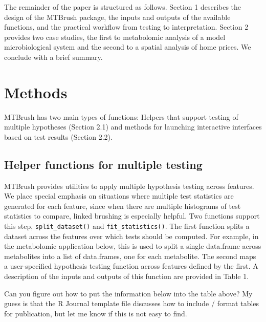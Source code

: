 The remainder of the paper is structured as follows. Section 1 describes
the design of the MTBrush package, the inputs and outputs of the
available functions, and the practical workflow from testing to
interpretation. Section 2 provides two case studies, the first to
metabolomic analysis of a model microbiological system and the second to
a spatial analysis of home prices. We conclude with a brief summary.

\hypertarget{methods}{%
\section{Methods}\label{methods}}

MTBrush has two main types of functions: Helpers that support testing of
multiple hypotheses (Section 2.1) and methods for launching interactive
interfaces based on test results (Section 2.2).

\hypertarget{helper-functions-for-multiple-testing}{%
\subsection{Helper functions for multiple
testing}\label{helper-functions-for-multiple-testing}}

MTBrush provides utilities to apply multiple hypothesis testing across
features. We place special emphasis on situations where multiple test
statistics are generated for each feature, since when there are multiple
histograms of test statistics to compare, linked brushing is especially
helpful. Two functions support this step, \texttt{split\_dataset()} and
\texttt{fit\_statistics()}. The first function splits a dataset across
the features over which tests should be computed. For example, in the
metabolomic application below, this is used to split a single data.frame
across metabolites into a list of data.frames, one for each metabolite.
The second maps a user-specified hypothesis testing function across
features defined by the first. A description of the inputs and outputs
of this function are provided in Table 1.

\color{violet}

Can you figure out how to put the information below into the table
above? My guess is that the R Journal template file discusses how to
include / format tables for publication, but let me know if this is not
easy to find. \color{black}

